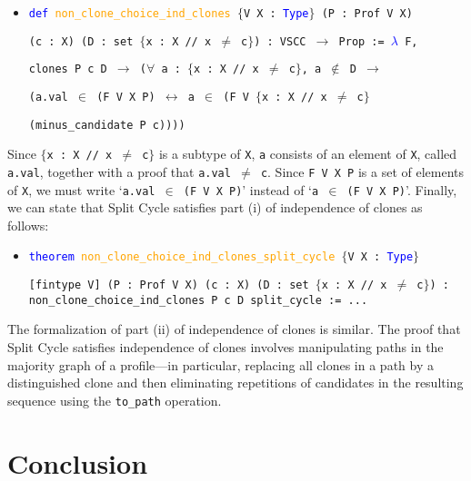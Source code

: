 \documentclass[runningheads]{llncs}
\begin{document}
\begin{itemize}
\item[] \texttt{\textcolor{blue}{def}   \textcolor{orange}{non\_clone\_choice\_ind\_clones} $\{$V X : \textcolor{blue}{Type}$\}$ (P : Prof V X)}

\texttt{(c : X) (D : set $\{$x : X // x $\neq$ c$\}$) : VSCC $\to$ Prop := \textcolor{blue}{$\lambda$} F, }

\texttt{clones P c D $\to$ ($\forall$  a : $\{$x : X // x $\neq$  c$\}$, a $\not\in$ D $\to$ }

\texttt{(a.val $\in$ (F V X P) $\leftrightarrow$ a $\in$ (F V $\{$x : X // x $\neq$ c$\}$} 

\texttt{(minus\_candidate P c))))}
\end{itemize}
Since \texttt{$\{$x : X // x $\neq$  c$\}$} is a subtype of \texttt{X},  \texttt{a} consists of an element of \texttt{X}, called \texttt{a.val}, together with a proof that \texttt{a.val $\neq$ c}. Since \texttt{F V X P} is a set of elements of \texttt{X}, we must write `\texttt{a.val $\in$ (F V X P)}' instead of `\texttt{a $\in$ (F V X P)}'. Finally, we can state that Split Cycle satisfies part (i) of independence of clones as follows:

\begin{itemize}
\item[] \texttt{\textcolor{blue}{theorem} \textcolor{orange}{non\_clone\_choice\_ind\_clones\_split\_cycle} $\{$V X : \textcolor{blue}{Type}$\}$}

\texttt{[fintype V] (P : Prof V X) (c : X) (D : set $\{$x : X // x $\neq$ c$\}$) : }
\texttt{non\_clone\_choice\_ind\_clones P c D split\_cycle := ...}
\end{itemize}
The formalization of part (ii) of independence of clones is similar. The proof that Split Cycle satisfies independence of clones involves manipulating paths in the majority graph of a profile---in particular, replacing all clones in a path by a distinguished clone and then eliminating repetitions of candidates in the resulting sequence using the \texttt{to\_path} operation.

\section{Conclusion}\label{Conclusion}
\end{document}
